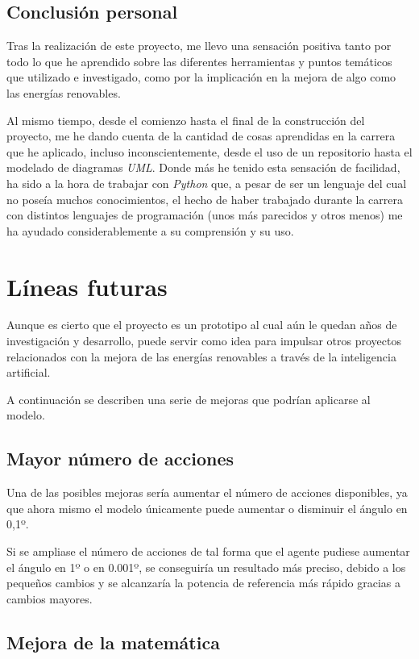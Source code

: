 \subsection{Conclusión personal}

Tras la realización de este proyecto, me llevo una sensación positiva tanto por todo lo que he aprendido sobre las diferentes herramientas y puntos temáticos que utilizado e investigado, como por la implicación en la mejora de algo como las energías renovables.

Al mismo tiempo, desde el comienzo hasta el final de la construcción del proyecto, me he dando cuenta de la cantidad de cosas aprendidas en la carrera que he aplicado, incluso inconscientemente, desde el uso de un repositorio hasta el modelado de diagramas \textit{UML}.
Donde más he tenido esta sensación de facilidad, ha sido a la hora de trabajar con \textit{Python} que, a pesar de ser un lenguaje del cual no poseía muchos conocimientos, el hecho de haber trabajado durante la carrera con distintos lenguajes de programación (unos más parecidos y otros menos) me ha ayudado considerablemente a su comprensión y su uso.


\section{Líneas futuras}

Aunque es cierto que el proyecto es un prototipo al cual aún le quedan años de investigación y desarrollo, puede servir como idea para impulsar otros proyectos relacionados con la mejora de las energías renovables a través de la inteligencia artificial.

A continuación se describen una serie de mejoras que podrían aplicarse al modelo.

\subsection{Mayor número de acciones}

Una de las posibles mejoras sería aumentar el número de acciones disponibles, ya que ahora mismo el modelo únicamente puede aumentar o disminuir el ángulo en 0,1º.

Si se ampliase el número de acciones de tal forma que el agente pudiese aumentar el ángulo en 1º o en 0.001º, se conseguiría un resultado más preciso, debido a los pequeños cambios y se alcanzaría la potencia de referencia más rápido gracias a cambios mayores.

\subsection{Mejora de la matemática}

